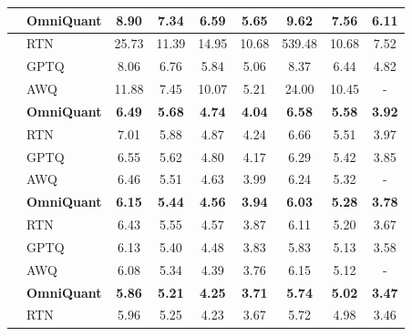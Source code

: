 \documentclass{article} %
\begin{document}
\begin{table}[t]
\begin{tabular}{llccccccc}
         & \textbf{OmniQuant}  & \textbf{8.90}  & \textbf{7.34} & \textbf{6.59} & \textbf{5.65}   & \textbf{9.62} & \textbf{7.56} & \textbf{6.11} \\ \hline
         & RTN & 25.73 & 11.39 & 14.95 & 10.68 & 539.48 & 10.68 & 7.52  \\
         & GPTQ &  8.06 & 6.76 & 5.84 & 5.06 & 8.37 & 6.44 & 4.82 \\
         & AWQ & 11.88 & 7.45 & 10.07 & 5.21  & 24.00 & 10.45 & - \\
         & \textbf{OmniQuant}  & \textbf{6.49} & \textbf{5.68} & \textbf{4.74} & \textbf{4.04}  & \textbf{6.58} & \textbf{5.58} & \textbf{3.92} \\ \hline
         & RTN & 7.01 & 5.88 & 4.87 & 4.24  & 6.66 & 5.51 & 3.97 \\
         & GPTQ &  6.55 & 5.62 & 4.80 & 4.17 & 6.29 & 5.42 & 3.85 \\
         & AWQ &  6.46 & 5.51 & 4.63 & 3.99 & 6.24 & 5.32 & -  \\
         & \textbf{OmniQuant}  & \textbf{6.15} & \textbf{5.44} & \textbf{4.56} & \textbf{3.94} & \textbf{6.03} & \textbf{5.28} & \textbf{3.78} \\ \hline
          & RTN & 6.43 & 5.55 & 4.57 & 3.87 & 6.11 & 5.20 & 3.67 \\
         & GPTQ & 6.13 & 5.40 & 4.48 & 3.83 & 5.83 & 5.13 & 3.58 \\
         & AWQ &  6.08 & 5.34 & 4.39 & 3.76  & 6.15 & 5.12 & - \\
         & \textbf{OmniQuant} & \textbf{5.86} & \textbf{5.21} & \textbf{4.25} & \textbf{3.71} & \textbf{5.74}  & \textbf{5.02} & \textbf{3.47}  \\ 
         \hline
          & RTN & 5.96 & 5.25 & 4.23 & 3.67 & 5.72 & 4.98 & 3.46 \\

\end{tabular}
\end{table}
\end{document}
